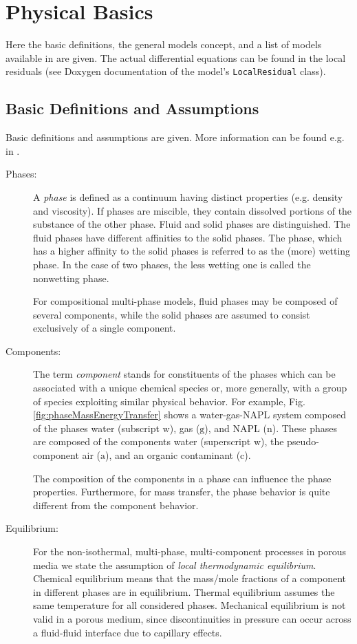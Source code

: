 \section{Physical Basics}
Here the basic definitions, the general models concept, and a list of
models available in \Dumux are given. The actual differential equations
can be found in the local residuals (see Doxygen documentation of the
model's \texttt{LocalResidual} class).

\subsection{Basic Definitions and Assumptions}
Basic definitions and assumptions are given. More information can be found e.g. in \cite{A3:acosta:2006,A3:bielinski:2006}.

\begin{description}
\item[Phases:]
A \emph{phase} is defined as a continuum having distinct properties (e.g. density and viscosity). If phases are miscible, they contain dissolved portions of the substance of the other phase. 
Fluid and solid phases are distinguished. The fluid phases have different affinities to the solid phases. The phase, which has a higher affinity to the solid phases is referred to as the (more) wetting phase. In the case of two phases, the less wetting one is called the nonwetting phase. 

For compositional multi-phase models, fluid phases may be composed of several components, while the solid phases are assumed to consist exclusively of a single component. 

\item[Components:]
The term \emph{component} stands for constituents of the phases which
can be associated with a unique chemical species or, more generally, with
a group of species exploiting similar physical behavior. For example, Fig. \ref{fig:phaseMassEnergyTransfer} shows a water-gas-NAPL system composed of the phases water (subscript
$\text{w}$), gas ($\text{g}$), and NAPL ($\text{n}$). These phases are
composed of the components water (superscript $\text{w}$), the pseudo-component
air ($\text{a}$), and an organic contaminant ($\text{c}$).

The composition of the components in a phase can influence the phase properties. Furthermore, for mass transfer, the phase behavior is quite different from the component behavior.

\item[Equilibrium:]
For the non-isothermal, multi-phase, multi-component processes in porous media
we state the assumption of \emph{local thermodynamic equilibrium}.
Chemical equilibrium means that the mass/mole fractions of a component in
different phases are in equilibrium.
Thermal equilibrium assumes the same temperature for all considered phases.
Mechanical equilibrium is not valid in a porous medium, since discontinuities
in pressure can occur across a fluid-fluid interface due to capillary effects.


\end{description}
